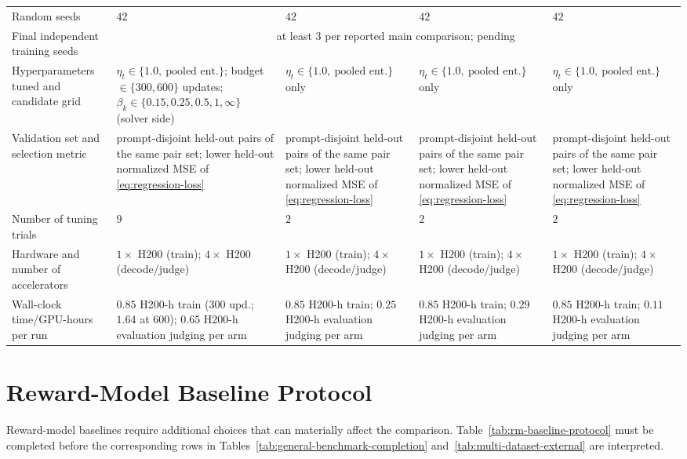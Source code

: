 \documentclass{article}
\theoremstyle{remark}
\theoremstyle{plain}
\begin{document}
\begin{table}[t]
\begin{tabular}{@{}p{}p{}p{}p{}p{}@{}}
Random seeds & $42$ & $42$ & $42$ & $42$ \\
Final independent training seeds & \multicolumn{4}{c}{at least $3$ per reported main comparison; pending} \\
Hyperparameters tuned and candidate grid & $\eta_t\in\{1.0,\ \text{pooled ent.}\}$; budget $\in\{300,600\}$ updates; $\beta_k\in\{0.15,0.25,0.5,1,\infty\}$ (solver side) & $\eta_t\in\{1.0,\ \text{pooled ent.}\}$ only & $\eta_t\in\{1.0,\ \text{pooled ent.}\}$ only & $\eta_t\in\{1.0,\ \text{pooled ent.}\}$ only \\
Validation set and selection metric & prompt-disjoint held-out pairs of the same pair set; lower held-out normalized MSE of \eqref{eq:regression-loss} & prompt-disjoint held-out pairs of the same pair set; lower held-out normalized MSE of \eqref{eq:regression-loss} & prompt-disjoint held-out pairs of the same pair set; lower held-out normalized MSE of \eqref{eq:regression-loss} & prompt-disjoint held-out pairs of the same pair set; lower held-out normalized MSE of \eqref{eq:regression-loss} \\
Number of tuning trials & $9$ & $2$ & $2$ & $2$ \\
Hardware and number of accelerators & $1\times$ H200 (train); $4\times$ H200 (decode/judge) & $1\times$ H200 (train); $4\times$ H200 (decode/judge) & $1\times$ H200 (train); $4\times$ H200 (decode/judge) & $1\times$ H200 (train); $4\times$ H200 (decode/judge) \\
Wall-clock time/GPU-hours per run & $0.85$ H200-h train ($300$ upd.; $1.64$ at $600$); $0.65$ H200-h evaluation judging per arm & $0.85$ H200-h train; $0.25$ H200-h evaluation judging per arm & $0.85$ H200-h train; $0.29$ H200-h evaluation judging per arm & $0.85$ H200-h train; $0.11$ H200-h evaluation judging per arm \\
\bottomrule
\end{tabular}
\end{table}

\section{Reward-Model Baseline Protocol}
\label{app:rm-baselines}
Reward-model baselines require additional choices that can materially affect the comparison. Table~\ref{tab:rm-baseline-protocol} must be completed before the corresponding rows in Tables~\ref{tab:general-benchmark-completion} and~\ref{tab:multi-dataset-external} are interpreted.
\end{document}

